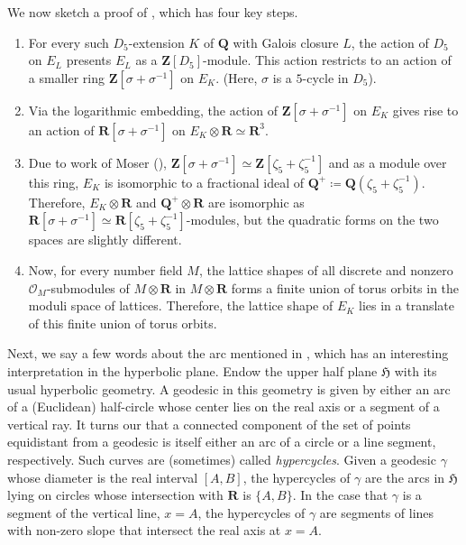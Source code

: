 \documentclass{amsart}
\newcommand{\QQ}{\mathbf{Q}}
\newcommand{\ZZ}{\mathbf{Z}}
\newcommand{\RR}{\mathbf{R}}
\newcommand{\cO}{\mathcal{O}}
\newcommand{\mf}[1]{\mathfrak{#1}}
\numberwithin{equation}{section}
\begin{document}
We now sketch a proof of , which has four key steps. 
\begin{enumerate}
    \item For every such $D_5$-extension $K$ of $\QQ$ with Galois closure $L$, the action of $D_5$ on $E_L$ presents $E_L$ as a $\ZZ[D_5]$-module. This action restricts to an action of a smaller ring $\ZZ[\sigma + \sigma^{-1}]$ on $E_K$. (Here, $\sigma$ is a $5$-cycle in $D_5$).
    \item Via the logarithmic embedding, the action of $\ZZ[\sigma + \sigma^{-1}]$ on $E_K$ gives rise to an action of $\RR[\sigma + \sigma^{-1}]$ on $E_K \otimes \RR \simeq \RR^3$. 
    
    \item  Due to work of Moser (\cite{Moser1979}), $\ZZ[\sigma + \sigma^{-1}] \simeq \ZZ[\zeta_5 + \zeta_5^{-1}]$ and as a module over this ring, $E_K$ is isomorphic to a fractional ideal of $\QQ^+ \coloneqq \QQ(\zeta_5 + \zeta_5^{-1})$. Therefore, $E_K \otimes \RR$ and $\QQ^+ \otimes \RR$ are isomorphic as $\RR[\sigma + \sigma^{-1}] \simeq \RR[\zeta_5 + \zeta_5^{-1}]$-modules, but the quadratic forms on the two spaces are slightly different. 
    \item Now, for every number field $M$, the lattice shapes of all discrete and nonzero $\cO_M$-submodules of $M \otimes \RR$ in $M \otimes \RR$ forms a finite union of torus orbits in the moduli space of lattices. Therefore, the lattice shape of $E_K$ lies in a translate of this finite union of torus orbits. 
\end{enumerate}


Next, we say a few words about the arc mentioned in , which has an interesting interpretation in the hyperbolic plane. Endow the upper half plane $\mf{H}$ with its usual hyperbolic geometry. A geodesic in this geometry is given by either an arc of a (Euclidean) half-circle whose center lies on the real axis or a segment of a vertical ray. It turns our that a connected component of the set of points equidistant from a geodesic is itself either an arc of a circle or a line segment, respectively. Such curves are (sometimes) called \textit{hypercycles}. Given a geodesic $\gamma$ whose diameter is the real interval $[A,B]$, the hypercycles of $\gamma$ are the arcs in $\mf{H}$ lying on circles whose intersection with $\RR$ is $\{A,B\}$. In the case that $\gamma$ is a segment of the vertical line, $x=A$, the hypercycles of $\gamma$ are segments of lines with non-zero slope that intersect the real axis at $x=A$.
\end{document}
